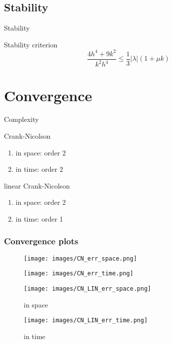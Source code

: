 \documentclass{beamer}
\begin{document}
	\subsection{Stability}
    \begin{frame}{Stability}
	    \begin{block}{Stability criterion}
	        \begin{equation*}
	            \frac{4h^4 + 9k^2}{k^2 h^4} \leq  \frac{1}{3} |\lambda|( 1 + \mu k)
    	    \end{equation*}
	    \end{block}
	\end{frame}
	
	\section{Convergence}
	\begin{frame}{Complexity}
	    \begin{block}{Crank-Nicolson}
	        \begin{enumerate}
	            \item in space: order 2
	            \item in time: order 2
	        \end{enumerate}
	    \end{block}
	    \begin{block}{linear Crank-Nicolson}
	        \begin{enumerate}
	            \item in space: order 2
	            \item in time: order 1
	        \end{enumerate}
	    \end{block}
	\end{frame}

	\begin{frame}
		\frametitle{Convergence plots}
		\begin{figure}[htbp]
			\begin{minipage}{0.49\linewidth}
				\centering
				\texttt{[image: images/CN\_err\_space.png]}
			\end{minipage}
			\hfill
			\begin{minipage}{0.49\linewidth}
				\centering
				\texttt{[image: images/CN\_err\_time.png]}
			\end{minipage}%
		\end{figure}%
		\begin{figure}[htbp]
			\begin{minipage}{0.49\linewidth}
				\centering
				\texttt{[image: images/CN\_LIN\_err\_space.png]}
				\caption{in space}
			\end{minipage}
			\hfill
			\begin{minipage}{0.49\linewidth}
				\centering
				\texttt{[image: images/CN\_LIN\_err\_time.png]}
				\caption{in time}
			\end{minipage}
		\end{figure}
	\end{frame}
	
\end{document}
